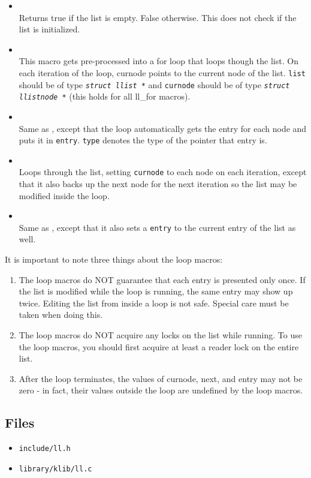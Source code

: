 \begin{itemize}
\item {} \\
Returns true if the list is empty. False otherwise. This does not check if the list is initialized.

\item {} \\
This macro gets pre-processed into a for loop that loops though the list. On each iteration of the loop,
curnode points to the current node of the list. \texttt{list} should be of type \texttt{\textit{struct llist *}}
and \texttt{curnode} should be of type \texttt{\textit{struct llistnode *}} (this holds for all ll\_for macros).

\item {} \\
Same as , except that the loop automatically gets the entry
for each node and puts it in \texttt{entry}. \texttt{type} denotes the type of the
pointer that entry is.

\item {} \\
Loops through the list, setting \texttt{curnode} to each node on each iteration, except that it
also backs up the next node for the next iteration so the list may be modified inside the loop.

\item {} \\
Same as , except that it also sets a \texttt{entry} to the
current entry of the list as well.

\end{itemize}

It is important to note three things about the loop macros:
\begin{enumerate}
\item The loop macros do NOT guarantee that each entry is presented only once. If the list is modified
while the loop is running, the same entry may show up twice. Editing the list from inside a loop is not safe.
Special care must be taken when doing this.

\item The loop macros do NOT acquire any locks on the list while running. To use the loop macros, you should
first acquire at least a reader lock on the entire list.

\item After the loop terminates, the values of curnode, next, and entry may not be zero - in fact, 
their values outside the loop are undefined by the loop macros.
\end{enumerate}

\subsection{Files}
\begin{itemize}
\item \texttt{include/ll.h}
\item \texttt{library/klib/ll.c}
\end{itemize}
